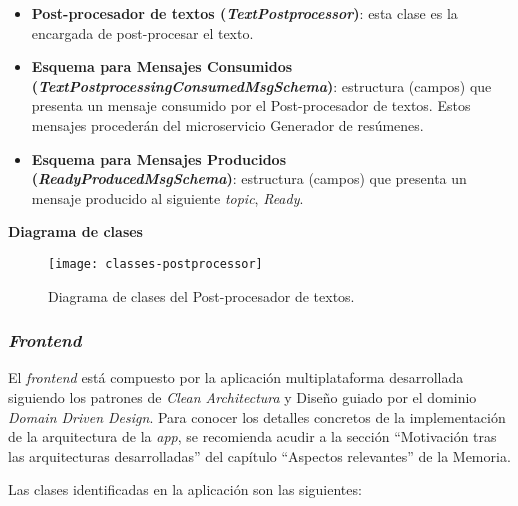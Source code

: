 \vspace{-0.2cm}
\begin{itemize} [\textbullet]
	\item \textbf{Post-procesador de textos (\emph{TextPostprocessor})}: esta clase es la encargada de post-procesar el texto.
	
	\item \textbf{Esquema para Mensajes Consumidos \\ (\emph{TextPostprocessingConsumedMsgSchema})}: estructura (campos) que presenta un mensaje consumido por el Post-procesador de textos. Estos mensajes procederán del microservicio Generador de resúmenes.
	
	\item \textbf{Esquema para Mensajes Producidos \\ (\emph{ReadyProducedMsgSchema})}: estructura (campos) que presenta un mensaje producido al siguiente \emph{topic}, \emph{Ready}.
\end{itemize}

\noindent
\textbf{Diagrama de clases}

\begin{figure}[h]
	\centering
	\texttt{[image: classes-postprocessor]}
	\vspace{-0.5cm}
	\caption{Diagrama de clases del Post-procesador de textos.}
\end{figure}


\subsubsection{\Large \emph{Frontend}}

El \emph{frontend} está compuesto por la aplicación multiplataforma desarrollada siguiendo los patrones de \emph{Clean Architectura} y Diseño guiado por el dominio \emph{Domain Driven Design}. Para conocer los detalles concretos de la implementación de la arquitectura de la \emph{app}, se recomienda acudir a la sección ``Motivación tras las arquitecturas desarrolladas'' del capítulo ``Aspectos relevantes'' de la Memoria.

Las clases identificadas en la aplicación son las siguientes:

